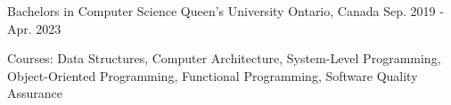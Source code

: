 

\begin{cventries}

  \cventry
    {Bachelors in Computer Science} %
    {Queen's University} %
    {Ontario, Canada} %
    {Sep. 2019 - Apr. 2023} %
    {
      \begin{cvitems} %
        \item {Courses: Data Structures, Computer Architecture, System-Level Programming, Object-Oriented Programming, Functional Programming, Software Quality Assurance}
      \end{cvitems}
    }

\end{cventries}

